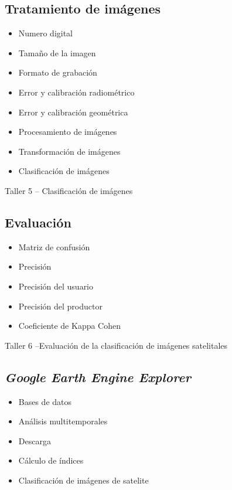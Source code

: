 \documentclass[a4paper,twoside,11pt,]{article}
\begin{document}
\subsection {Tratamiento de imágenes}
\begin{itemize}
\item Numero digital
\item Tamaño de la imagen
\item Formato de grabación
\item Error y calibración radiométrico
\item Error y calibración geométrica
\item Procesamiento de imágenes
\item Transformación de imágenes
\item Clasificación de imágenes
\end{itemize}

\begin{tcolorbox}[enhanced,width=5in,center upper,  fontupper=\large\bfseries,drop shadow southwest,sharp corners]
Taller 5 -- Clasificación de imágenes
\end{tcolorbox}

\subsection {Evaluación}
\begin{itemize}
\item Matriz de confusión
\item Precisión
\item Precisión del usuario
\item Precisión del productor
\item Coeficiente de Kappa Cohen
\end{itemize}

\begin{tcolorbox}[enhanced,width=5in,center upper,  fontupper=\large\bfseries,drop shadow southwest,sharp corners]
Taller 6 --Evaluación de la clasificación de imágenes satelitales
\end{tcolorbox}

\subsection {\emph{Google Earth Engine Explorer}}
\begin{itemize}
\item Bases de datos
\item Análisis multitemporales
\item Descarga
\item Cálculo de índices
\item Clasificación de imágenes de satelite
\end{itemize}
\end{document}
